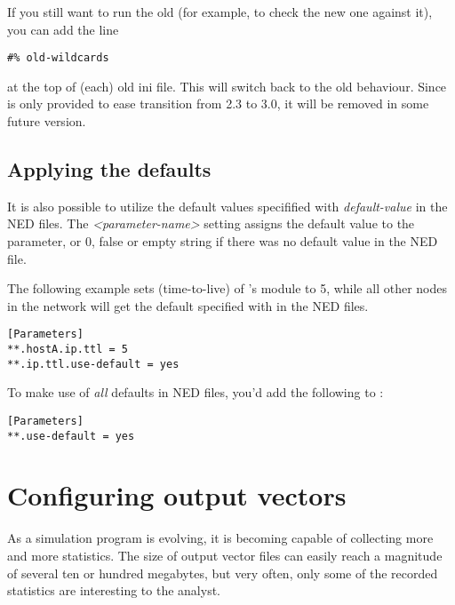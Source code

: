 If you still want to run the old  (for example, to check the new one
against it), you can add the line

\begin{verbatim}
#% old-wildcards
\end{verbatim}

at the top of (each) old ini file. This will switch back to the old
behaviour. Since  is only provided to ease transition
from {\opp} 2.3 to 3.0, it will be removed in some future version.


\subsection{Applying the defaults}

It is also possible to utilize the default values specifified with
\textit{default-value}\ttt{)} in the NED files.{\new}
The \textit{<parameter-name>} setting assigns
the default value to the parameter, or 0, false or empty string if
there was no default value in the NED file.

The following example sets  (time-to-live) of 's
 module to 5, while all other nodes in the network
will get the default specified with  in the NED files.

\begin{Verbatim}[commandchars=\\\{\}]
[Parameters]
**.hostA.ip.ttl = 5
**.ip.ttl.use-default = yes
\end{Verbatim}

To make use of \textit{all} defaults in NED files, you'd add the following to
:

\begin{verbatim}
[Parameters]
**.use-default = yes
\end{verbatim}


\section{Configuring output vectors}
\label{sec:ch-run-sim:outvectors}

As a simulation program is evolving, it is becoming capable of
collecting more and more statistics. The size of output vector
files can easily reach a magnitude of
several ten or hundred megabytes, but very often, only some of the
recorded statistics are interesting to the analyst.

